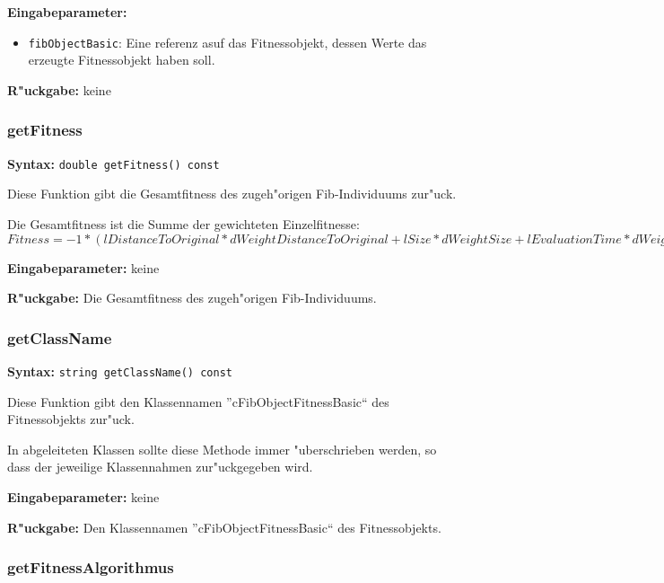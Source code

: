 \bigskip\noindent
\textbf{Eingabeparameter:}
\begin{itemize}
 \item \verb|fibObjectBasic|: Eine referenz asuf das Fitnessobjekt, dessen Werte das erzeugte Fitnessobjekt haben soll.
\end{itemize}

\bigskip\noindent
\textbf{R"uckgabe:} keine


\subsubsection{getFitness}

\textbf{Syntax:} \verb|double getFitness() const|

\bigskip\noindent
Diese Funktion gibt die Gesamtfitness des zugeh"origen Fib-Individuums zur"uck.

Die Gesamtfitness ist die Summe der gewichteten Einzelfitnesse: $Fitness= -1 * (lDistanceToOriginal*dWeightDistanceToOriginal+lSize*dWeightSize+lEvaluationTime*dWeightEvaluationTime)$

\bigskip\noindent
\textbf{Eingabeparameter:} keine

\bigskip\noindent
\textbf{R"uckgabe:} Die Gesamtfitness des zugeh"origen Fib-Individuums.


\subsubsection{getClassName}

\textbf{Syntax:} \verb|string getClassName() const|

\bigskip\noindent
Diese Funktion gibt den Klassennamen ''cFibObjectFitnessBasic`` des Fitnessobjekts zur"uck.

In abgeleiteten Klassen sollte diese Methode immer "uberschrieben werden, so dass der jeweilige Klassennahmen zur"uckgegeben wird.

\bigskip\noindent
\textbf{Eingabeparameter:} keine

\bigskip\noindent
\textbf{R"uckgabe:} Den Klassennamen ''cFibObjectFitnessBasic`` des Fitnessobjekts.


\subsubsection{getFitnessAlgorithmus}

